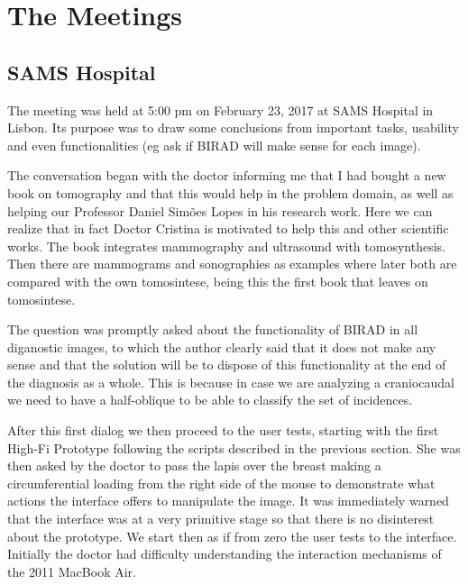 \clearpage

\section{The Meetings}

\subsection{SAMS Hospital}

The meeting was held at 5:00 pm on February 23, 2017 at SAMS Hospital in Lisbon. Its purpose was to draw some conclusions from important tasks, usability and even functionalities (eg ask if BIRAD will make sense for each image).

The conversation began with the doctor informing me that I had bought a new book on tomography and that this would help in the problem domain, as well as helping our Professor Daniel Sim\~{o}es Lopes in his research work. Here we can realize that in fact Doctor Cristina is motivated to help this and other scientific works. The book integrates mammography and ultrasound with tomosynthesis. Then there are mammograms and sonographies as examples where later both are compared with the own tomosintese, being this the first book that leaves on tomosintese.

The question was promptly asked about the functionality of BIRAD in all diganostic images, to which the author clearly said that it does not make any sense and that the solution will be to dispose of this functionality at the end of the diagnosis as a whole. This is because in case we are analyzing a craniocaudal we need to have a half-oblique to be able to classify the set of incidences.

After this first dialog we then proceed to the user tests, starting with the first High-Fi Prototype following the scripts described in the previous section. She was then asked by the doctor to pass the lapis over the breast making a circumferential loading from the right side of the mouse to demonstrate what actions the interface offers to manipulate the image. It was immediately warned that the interface was at a very primitive stage so that there is no disinterest about the prototype. We start then as if from zero the user tests to the interface. Initially the doctor had difficulty understanding the interaction mechanisms of the 2011 MacBook Air.

\clearpage


